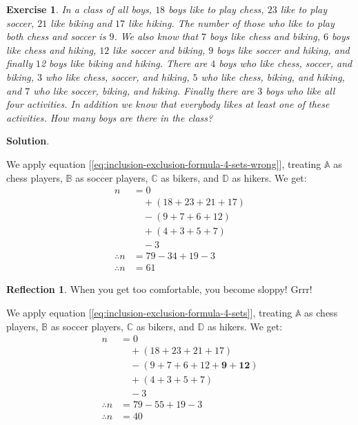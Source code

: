 \documentclass[11pt]{book}
\theoremstyle{definition}
\theoremstyle{plain}
\newtheorem{exercise}{Exercise}
\theoremstyle{definition}
\theoremstyle{problemstyle}
\theoremstyle{remark}
\theoremstyle{definition}
\newtheorem{reflection}{Reflection}
\begin{document}
\begin{exercise}
    \label{ex:2.3.1}
    In a class of all boys, $18$ boys like to play chess, $23$ like to play soccer, $21$ like biking and $17$ like hiking. The number of those who like to play both chess and soccer is $9$. We also know that $7$ boys like chess and biking, $6$ boys like chess and hiking, $12$ like soccer and biking, $9$ boys like soccer and hiking, and finally $1$2 boys like biking and hiking. There are $4$ boys who like chess, soccer, and biking, $3$ who like chess, soccer, and hiking, $5$ who like chess, biking, and hiking, and $7$ who like soccer, biking, and hiking. Finally there are $3$ boys who like all four activities. In addition we know that everybody likes at least one of these activities. How many boys are there in the class?
\end{exercise}
\textbf{Solution}.
\begin{mybox}[Sloppiness!]
We apply equation [\ref{eq:inclusion-exclusion-formula-4-sets-wrong}], treating $\mathbb{A}$ as chess players, $\mathbb{B}$ as soccer players, $\mathbb{C}$ as bikers, and $\mathbb{D}$ as hikers. We get:
\begin{align*}
    n&=0\\
    &\quad+(18+23+21+17)\\
    &\quad-(9+7+6+12)\\
    &\quad+(4+3+5+7)\\
    &\quad-3\\
    \therefore n&=79-34+19-3\\
    \therefore n&=61
\end{align*}
\end{mybox}

\begin{reflection}
    When you get too comfortable, you become sloppy! Grrr!
\end{reflection}
We apply equation [\ref{eq:inclusion-exclusion-formula-4-sets}], treating $\mathbb{A}$ as chess players, $\mathbb{B}$ as soccer players, $\mathbb{C}$ as bikers, and $\mathbb{D}$ as hikers. We get:
\begin{align*}
    n&=0\\
    &\quad+(18+23+21+17)\\
    &\quad-(9+7+6+12+\boldsymbol{9+12})\\
    &\quad+(4+3+5+7)\\
    &\quad-3\\
    \therefore n&=79-55+19-3\\
    \therefore n&=40
\end{align*}
\end{document}
